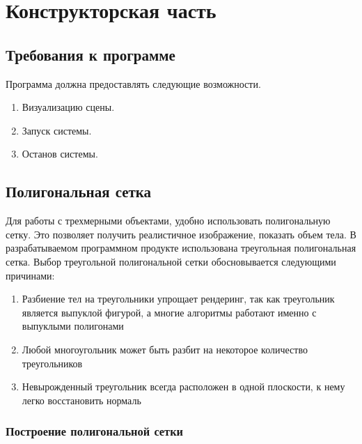 \chapter{Конструкторская часть}
\label{cha:design}

\section{Требования к программе}

Программа должна предоставлять следующие возможности.

\begin{enumerate}
	\item Визуализацию сцены.
	\item Запуск системы.
	\item Останов системы.
\end{enumerate}

\section{Полигональная сетка}

Для работы с трехмерными объектами, удобно использовать полигональную сетку. Это позволяет получить реалистичное изображение, показать объем тела.
В разрабатываемом программном продукте использована треугольная полигональная сетка. Выбор треугольной полигональной сетки обосновывается следующими причинами:

\begin{enumerate}
	\item Разбиение тел на треугольники упрощает рендеринг, так как треугольник является выпуклой фигурой, а многие алгоритмы работают именно с выпуклыми полигонами 
	\item Любой многоугольник может быть разбит на некоторое количество треугольников 
	\item Невырожденный треугольник всегда расположен в одной плоскости, к нему легко восстановить нормаль
\end{enumerate}


\begin{figure}[ht!]
\end{figure}

\subsection {Построение полигональной сетки}

